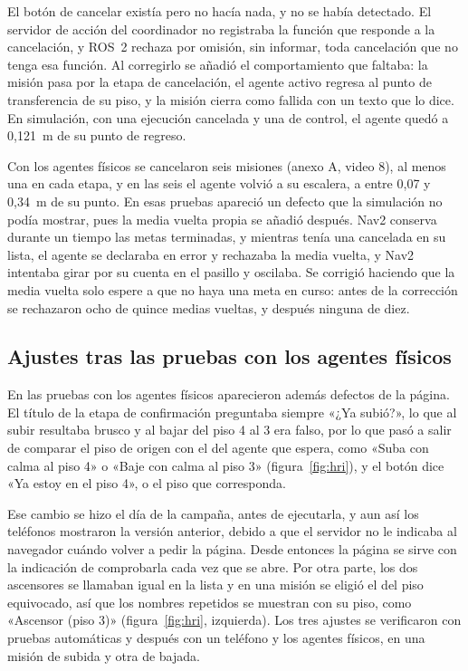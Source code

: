 El botón de cancelar existía pero no hacía nada, y no se había detectado. El servidor de acción del coordinador no registraba la función que responde a la cancelación, y ROS~2 rechaza por omisión, sin informar, toda
cancelación que no tenga esa función. Al corregirlo se añadió el comportamiento que faltaba: la misión pasa por la etapa de cancelación, el agente activo regresa al punto de transferencia de su piso, y la misión cierra como
fallida con un texto que lo dice. En simulación, con una ejecución cancelada y una de control, el agente quedó a 0,121~m de su punto de regreso.

Con los agentes físicos se cancelaron seis misiones (anexo A, video 8), al menos una en cada etapa, y en las seis el agente volvió a su escalera, a entre 0,07 y 0,34~m de su punto. En esas pruebas apareció un defecto que la simulación no podía mostrar, pues la media vuelta propia se añadió después. Nav2 conserva durante un tiempo las metas terminadas, y mientras tenía una cancelada en su lista, el agente se declaraba en error y rechazaba la
media vuelta, y Nav2 intentaba girar por su cuenta en el pasillo y oscilaba. Se corrigió haciendo que la media vuelta solo espere a que no haya una meta en curso: antes de la corrección se rechazaron ocho de quince
medias vueltas, y después ninguna de diez.

\subsection{Ajustes tras las pruebas con los agentes físicos}
\label{sec:ajustes-campo}

En las pruebas con los agentes físicos aparecieron además defectos de la página. El título de la etapa de confirmación preguntaba siempre «¿Ya subió?», lo que al subir resultaba brusco y al bajar del piso 4 al 3 era falso, por
lo que pasó a salir de comparar el piso de origen con el del agente que espera, como «Suba con calma al piso 4» o «Baje con calma al piso 3» (figura~\ref{fig:hri}), y el botón dice «Ya estoy en el piso 4», o el piso que
corresponda.

Ese cambio se hizo el día de la campaña, antes de ejecutarla, y aun así los teléfonos mostraron la versión anterior, debido a que el servidor no le indicaba al navegador cuándo volver a pedir la página. Desde entonces la
página se sirve con la indicación de comprobarla cada vez que se abre. Por otra parte, los dos ascensores se llamaban igual en la lista y en una misión se eligió el del piso equivocado, así que los nombres repetidos se
muestran con su piso, como «Ascensor (piso 3)» (figura~\ref{fig:hri}, izquierda). Los tres ajustes se verificaron con pruebas automáticas y después con un teléfono y los agentes físicos, en una misión de subida y otra de
bajada.

